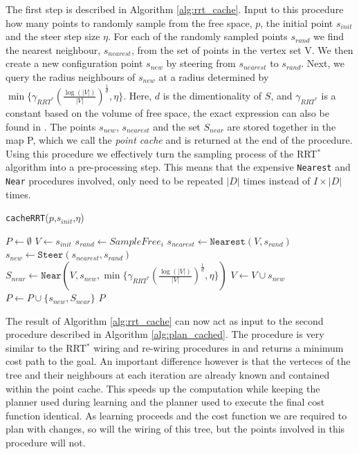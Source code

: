 \documentclass{article}  %
\begin{document}
	The first step is described in Algorithm \ref{alg:rrt_cache}. Input to this procedure how many points to randomly sample from the free space, $p$, the initial point $s_{init}$ and the steer step size $\eta$. For each of the randomly sampled points $s_{rand}$ we find the nearest neighbour, $s_{nearest}$, from the set of points in the vertex set V. We then create a new configuration point $s_{new}$ by steering from $s_{nearest}$ to $s_{rand}$. Next, we query the radius neighbours of $s_{new}$ at a radius determined by  $\min\{\gamma_{RRT^*}(\frac{\log(|V|)}{|V|})^{\frac{1}{d}},\eta\}$. Here, $d$ is the dimentionality of $S$, and $\gamma_{RRT^*}$ is a constant based on the volume of free space, the exact expression can also be found in \cite{karaman2011sampling}. The points $s_{new}$, $s_{nearest}$ and the set $S_{near}$ are stored together in the map P, which we call the \emph{point cache} and is returned at the end of the procedure. Using this procedure we effectively turn the sampling process of the RRT$^*$ algorithm into a pre-processing step. This means that the expensive \texttt{Nearest} and \texttt{Near} procedures involved, only need to be repeated $|D|$ times instead of $I\times|D|$ times.




	\begin{algorithm}
  	\scriptsize
	\caption{\texttt{cacheRRT}($p$,$s_{init}$,$\eta$)}
	\label{alg:rrt_cache}
	\begin{algorithmic}[1]
	\STATE $P \gets \emptyset$ \hfill {}
	\STATE $V \gets {s_{init}}$
	\STATE $s_{rand} \gets SampleFree_i$
	\STATE $s_{nearest} \gets \texttt{Nearest}(V,s_{rand})$
	\STATE $s_{new} \gets \texttt{Steer}(s_{nearest},s_{rand})$
	\STATE $S_{near} \gets \texttt{Near}(V,{s_{new}},\min\{\gamma_{RRT^*}(\frac{\log(|V|)}{|V|})^{\frac{1}{d}},\eta\})$ 
	\STATE $V\gets V \cup s_{new}$
	\STATE $P \gets P \cup \{s_{new},S_{near}\}$
	\ENDFOR
	\RETURN $P$

	\end{algorithmic}
	\end{algorithm}

	The result of Algorithm \ref{alg:rrt_cache} can now act as input to the second procedure described in Algorithm \ref{alg:plan_cached}. The procedure is very similar to the RRT$^*$ wiring and re-wiring procedures in \cite{karaman2011sampling} and returns a minimum cost path to the goal. An important difference however is that the verteces of the tree and their neighbours at each iteration are already known and contained within the point cache. This speeds up the computation while keeping the planner used during learning and the planner used to execute the final cost function identical. As learning proceeds and the cost function we are required to plan with changes, so will the wiring of this tree, but the points involved in this procedure will not. 
\end{document}
